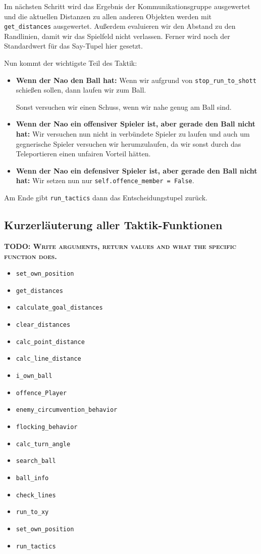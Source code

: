 Im nächsten Schritt wird das Ergebnis der Kommunikationsgruppe ausgewertet und die aktuellen Distanzen zu allen anderen Objekten werden mit \texttt{get\_distances} ausgewertet. Außerdem evaluieren wir den Abstand zu den Randlinien, damit wir das Spielfeld nicht verlassen. Ferner wird noch der Standardwert für das Say-Tupel hier gesetzt. 

Nun kommt der wichtigste Teil des Taktik:

\begin{itemize}
\item \textbf{Wenn der Nao den Ball hat: }
Wenn wir aufgrund von \texttt{stop\_run\_to\_shott} schießen sollen, dann laufen wir zum Ball.

Sonst versuchen wir einen Schuss, wenn wir nahe genug am Ball sind.
\item \textbf{Wenn der Nao ein offensiver Spieler ist, aber gerade den Ball nicht hat: }
Wir versuchen nun nicht in verbündete Spieler zu laufen und auch um gegnerische Spieler versuchen wir herumzulaufen, da wir sonst durch das Teleportieren einen unfairen Vorteil hätten. 
\item \textbf{Wenn der Nao ein defensiver Spieler ist, aber gerade den Ball nicht hat: }
Wir setzen nun nur \texttt{self.offence\_member = False}.
\end{itemize}

Am Ende gibt \texttt{run\_tactics} dann das \glqq Entscheidungstupel \grqq zurück.

\subsection*{Kurzerläuterung aller Taktik-Funktionen}
\textbf{\textsc{TODO: Write arguments, return values and what the specific function does.}}
\begin{itemize}
\item \texttt{set\_own\_position}
\item \texttt{get\_distances}
\item \texttt{calculate\_goal\_distances}
\item \texttt{clear\_distances}
\item \texttt{calc\_point\_distance}
\item \texttt{calc\_line\_distance}
\item \texttt{i\_own\_ball}
\item \texttt{offence\_Player}
\item \texttt{enemy\_circumvention\_behavior}
\item \texttt{flocking\_behavior}
\item \texttt{calc\_turn\_angle}
\item \texttt{search\_ball}
\item \texttt{ball\_info}
\item \texttt{check\_lines}
\item \texttt{run\_to\_xy}
\item \texttt{set\_own\_position}
\item \texttt{run\_tactics}
\end{itemize}




